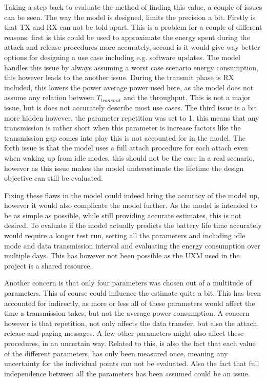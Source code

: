 Taking a step back to evaluate the method of finding this value, a couple of issues can be seen. The way the model is designed, limits the precision a bit. Firstly is that TX and RX can not be told apart. This is a problem for a couple of different reasons: first is this could be used to approximate the energy spent during the attach and release procedures more accurately, second is it would give way better options for designing a use case including e.g. software updates. The model handles this issue by always assuming a worst case scenario energy consumption, this however leads to the another issue. During the transmit phase is RX included, this lowers the power average power used here, as the model does not assume any relation between $T_{transmit}$ and the throughput. This is not a major issue, but is does not accurately describe most use cases. The third issue is a bit more hidden however, the parameter repetition was set to 1, this means that any transmission is rather short when this parameter is increase factors like the transmission gap comes into play this is not accounted for in the model. The forth issue is that the model uses a full attach procedure for each attach even when waking up from idle modes, this should not be the case in a real scenario, however as this issue makes the model underestimate the lifetime the design objective can still be evaluated.

Fixing these flaws in the model could indeed bring the accuracy of the model up, however it would also complicate the model further. As the model is intended to be as simple as possible, while still providing accurate estimates, this is not desired. To evaluate if the model actually predicts the battery life time accurately would require a longer test run, setting all the parameters and including idle mode and data transmission interval and evaluating the energy consumption over multiple days. This has however not been possible as the UXM used in the project is a shared resource. 

Another concern is that only four parameters was chosen out of a multitude of parameters. This of course could influence the estimate quite a bit. This has been accounted for indirectly, as more or less all of these parameters would affect the time a transmission takes, but not the average power consumption. A concern however is that repetition, not only affects the data transfer, but also the attach, release and paging messages. A few other parameters might also affect these procedures, in an uncertain way. Related to this, is also the fact that each value of the different parameters, has only been measured once, meaning any uncertainty for the individual points can not be evaluated. Also the fact that full independence between all the parameters has been assumed could be an issue. 

